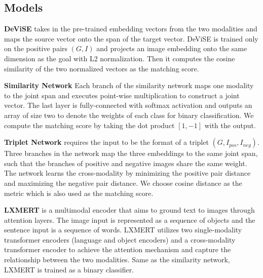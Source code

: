 \documentclass[11pt]{article}
\begin{document}
\subsection{Models}

\noindent
\textbf{DeViSE} takes in the pre-trained embedding vectors from the two modalities and maps the source vector onto the span of the target vector. DeViSE is trained only on the positive pairs $(G, I)$  and projects an image embedding onto the same dimension as the goal with L2 normalization. Then it computes the cosine similarity of the two normalized vectors as the matching score.

\noindent
\textbf{Similarity Network} Each branch of the similarity network maps one modality to the joint span and executes point-wise multiplication to construct a joint vector. The last layer is fully-connected with softmax activation and outputs an array of size two to denote the weights of each class for binary classification. We compute the matching score by taking the dot product $[1, -1]$ with the output.

\noindent
\textbf{Triplet Network} requires the input to be the format of a triplet $(G, I_{pos}, I_{neg})$. Three branches in the network map the three embeddings to the same joint span, such that the branches of positive and negative images share the same weight. The network learns the cross-modality by minimizing the positive pair distance and maximizing the negative pair distance. We choose cosine distance as the metric which is also used as the matching score.

\noindent
\textbf{LXMERT} is a multimodal encoder that aims to ground text to images through attention layers. The image input is represented as a sequence of objects and the sentence input is a sequence of words. LXMERT utilizes two single-modality transformer encoders (language and object encoders) and a cross-modality transformer encoder to achieve the attention mechanism and capture the relationship between the two modalities. Same as the similarity network, LXMERT is trained as a binary classifier.
\end{document}
